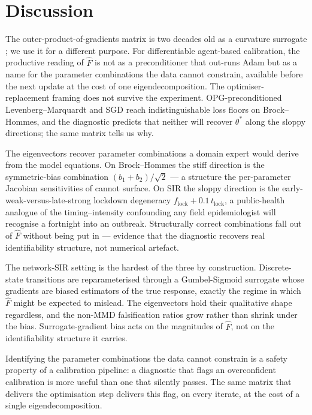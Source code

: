 \section{Discussion}
\label{sec:discussion}

The outer-product-of-gradients matrix is two decades old as a
curvature surrogate
\citep{schraudolph_sgn_2002,martens_kfac_2015}; we use it for a
different purpose. For differentiable agent-based calibration, the
productive reading of $\widehat F$ is not as a preconditioner that
out-runs Adam but as a name for the parameter combinations the data
cannot constrain, available before the next update at the cost of one
eigendecomposition. The optimiser-replacement framing does not
survive the experiment. OPG-preconditioned Levenberg--Marquardt and
SGD reach indistinguishable loss floors on Brock--Hommes, and the
diagnostic predicts that neither will recover $\theta^*$ along the
sloppy directions; the same matrix tells us why.

The eigenvectors recover parameter combinations a domain expert would
derive from the model equations. On Brock--Hommes the stiff direction
is the symmetric-bias combination $(b_1 + b_2)/\sqrt{2}$ --- a
structure the per-parameter Jacobian sensitivities of
\citet{querabofarull_diffabm_2025} cannot surface. On SIR the sloppy
direction is the early-weak-versus-late-strong lockdown degeneracy
$f_{\mathrm{lock}} + 0.1\, t_{\mathrm{lock}}$, a public-health analogue
of the timing--intensity confounding any field epidemiologist will
recognise a fortnight into an outbreak. Structurally correct
combinations fall out of $\widehat F$ without being put in --- evidence
that the diagnostic recovers real identifiability structure, not
numerical artefact.

The network-SIR setting is the hardest of the three by construction.
Discrete-state transitions are reparameterised through a Gumbel-Sigmoid
surrogate \citep{maddison_concrete_2017,jang_gumbel_2017} whose
gradients are biased estimators of the true response, exactly the
regime in which $\widehat F$ might be expected to mislead. The
eigenvectors hold their qualitative shape regardless, and the non-MMD
falsification ratios grow rather than shrink under the bias.
Surrogate-gradient bias acts on the magnitudes of $\widehat F$, not on
the identifiability structure it carries.

Identifying the parameter combinations the data cannot constrain is a
safety property of a calibration pipeline: a diagnostic that flags an
overconfident calibration is more useful than one that silently
passes. The same matrix that delivers the optimisation step delivers
this flag, on every iterate, at the cost of a single eigendecomposition.
